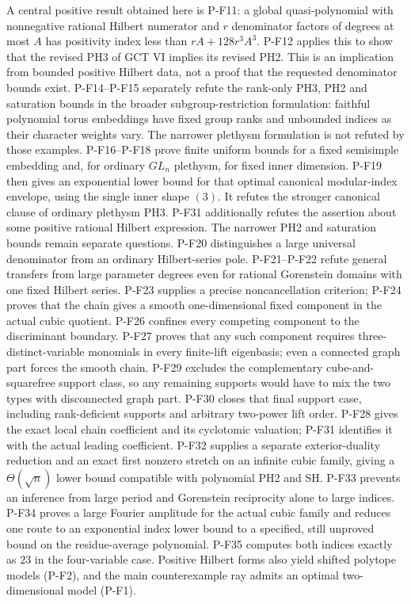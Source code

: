 \documentclass[11pt,a4paper]{article}
\begin{document}
A central positive result obtained here is P-F11: a global
quasi-polynomial with nonnegative rational Hilbert numerator and
$r$ denominator factors of degrees at most $A$ has positivity index
less than $rA+128r^3A^3$. P-F12 applies this to show that the revised
PH3 of GCT VI implies its revised PH2. This is an implication from
bounded positive Hilbert data, not a proof that the requested
denominator bounds exist.
P-F14--P-F15 separately refute the rank-only PH3, PH2 and saturation
bounds in the broader subgroup-restriction formulation: faithful
polynomial torus embeddings have fixed group ranks and unbounded
indices as their character weights vary. The narrower plethysm
formulation is not refuted by those examples.
P-F16--P-F18 prove finite uniform bounds for a fixed semisimple
embedding and, for ordinary $GL_n$ plethysm, for fixed inner dimension.
P-F19 then gives an exponential lower bound for that optimal canonical
modular-index envelope, using the single inner shape $(3)$.
It refutes the stronger canonical clause of ordinary plethysm PH3.
P-F31 additionally refutes the assertion about some positive rational
Hilbert expression. The narrower PH2 and saturation bounds remain
separate questions.
P-F20 distinguishes a large universal denominator from an ordinary
Hilbert-series pole. P-F21--P-F22 refute general transfers from large
parameter degrees even for rational Gorenstein domains with one fixed
Hilbert series. P-F23 supplies a precise noncancellation criterion;
P-F24 proves that the chain gives a smooth one-dimensional fixed
component in the actual cubic quotient. P-F26 confines every competing component
to the discriminant boundary. P-F27 proves that any such component
requires three-distinct-variable monomials in every finite-lift
eigenbasis; even a connected graph part forces the smooth chain.
P-F29 excludes the complementary cube-and-squarefree support class,
so any remaining supports would have to mix the two types with
disconnected graph part. P-F30 closes that final support case,
including rank-deficient supports and arbitrary two-power lift order.
P-F28 gives the exact local chain coefficient and its cyclotomic
valuation; P-F31 identifies it with the actual leading coefficient.
P-F32 supplies a separate exterior-duality reduction and an exact
first nonzero stretch on an infinite cubic family, giving a
$\Theta(\sqrt n)$ lower bound compatible with polynomial PH2 and SH.
P-F33 prevents an inference from large period and Gorenstein
reciprocity alone to large indices. P-F34 proves a large Fourier
amplitude for the actual cubic family and reduces one route to
an exponential index lower bound to a specified, still unproved
bound on the residue-average polynomial. P-F35 computes both
indices exactly as $23$ in the four-variable case.
Positive Hilbert forms also yield
shifted polytope models (P-F2), and the main counterexample ray admits
an optimal two-dimensional model (P-F1).
\end{document}
